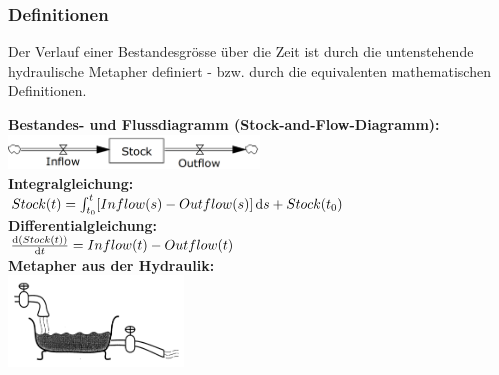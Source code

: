 \subsubsection{Definitionen}
Der Verlauf einer Bestandesgrösse über die Zeit ist durch die untenstehende hydraulische Metapher definiert - bzw. durch die equivalenten mathematischen Definitionen.\\
\begin{multicols}{2}
	\textbf{Bestandes- und Flussdiagramm (Stock-and-Flow-Diagramm):} \\
	\includegraphics[width=0.5\textwidth]{pictures/badewanne_stock} \\
	\textbf{Integralgleichung:} \\
	$Stock(t) = \int_{t_0}^{t} \! {[Inflow(s)-Outflow(s)]} \, \mathrm{d}{s}+Stock(t_0)$\\
	\textbf{Differentialgleichung:} \\
	$\frac{\mathrm{d}{(Stock(t))}}{\mathrm{d}{t}} = Inflow(t) - Outflow(t)$ \\
	\textbf{Metapher aus der Hydraulik:} \\
	\includegraphics[width=0.35\textwidth]{pictures/badewanne}
\end{multicols}


